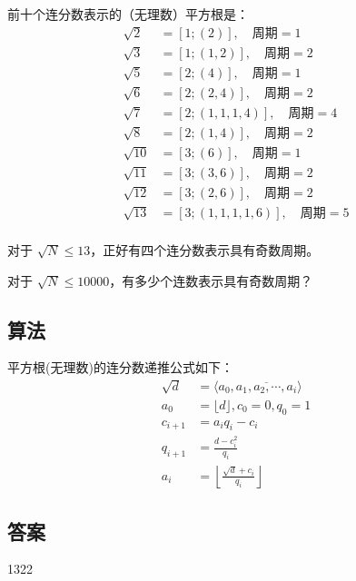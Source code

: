 \begin{tcolorbox}[breakable]
	前十个连分数表示的（无理数）平方根是：
	\begin{align*}
		\sqrt{2}  & = [1; (2)], \quad \text{周期} = 1             \\
		\sqrt{3}  & = [1; (1, 2)], \quad \text{周期} = 2          \\
		\sqrt{5}  & = [2; (4)], \quad \text{周期} = 1             \\
		\sqrt{6}  & = [2; (2, 4)], \quad \text{周期} = 2          \\
		\sqrt{7}  & = [2; (1, 1, 1, 4)], \quad \text{周期} = 4    \\
		\sqrt{8}  & = [2; (1, 4)], \quad \text{周期} = 2          \\
		\sqrt{10} & = [3; (6)], \quad \text{周期} = 1             \\
		\sqrt{11} & = [3; (3, 6)], \quad \text{周期} = 2          \\
		\sqrt{12} & = [3; (2, 6)], \quad \text{周期} = 2          \\
		\sqrt{13} & = [3; (1, 1, 1, 1, 6)], \quad \text{周期} = 5 \\
	\end{align*}

	对于 $\sqrt{N} \leq 13$，正好有四个连分数表示具有奇数周期。

	对于 $\sqrt{N} \leq 10000$，有多少个连数表示具有奇数周期？

\end{tcolorbox}

\subsection{算法}
平方根(无理数)的连分数递推公式如下：
\begin{align*}
	\sqrt{d} & = \langle a_0, \overline{a_1, a_2, \cdots, a_i} \rangle \\
	a_0      & = \lfloor d \rfloor, c_0 = 0, q_0 = 1                   \\
	c_{i+1}  & = a_iq_i - c_i                                          \\
	q_{i+1}  & = \frac{d - c_i^2}{q_i}                                 \\
	a_i      & = \left\lfloor \frac{\sqrt{d} + c_i}{q_i} \right\rfloor
\end{align*}

\subsection{答案}
1322
